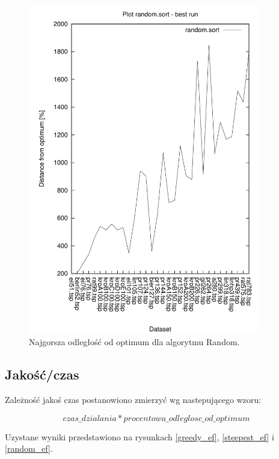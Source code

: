 \begin{figure}
\begin{center}
\includegraphics[width=0.9\textwidth]{wykresy/random_sort_worst}
\end{center}
\caption{Najgorsza odległość od optimum dla algorytmu Random.}
\label{random_sort_worst}
\end{figure}

\subsection{Jakość/czas}

Zależność jakoś czas postanowiono zmierzyć wg nastepującego wzoru:

$$ czas\_dzialania * procentowa\_odleglosc\_od\_optimum $$

Uzystane wyniki przedstawiono na rysunkach \ref{greedy_ef}, \ref{steepest_ef} i
\ref{random_ef}.

